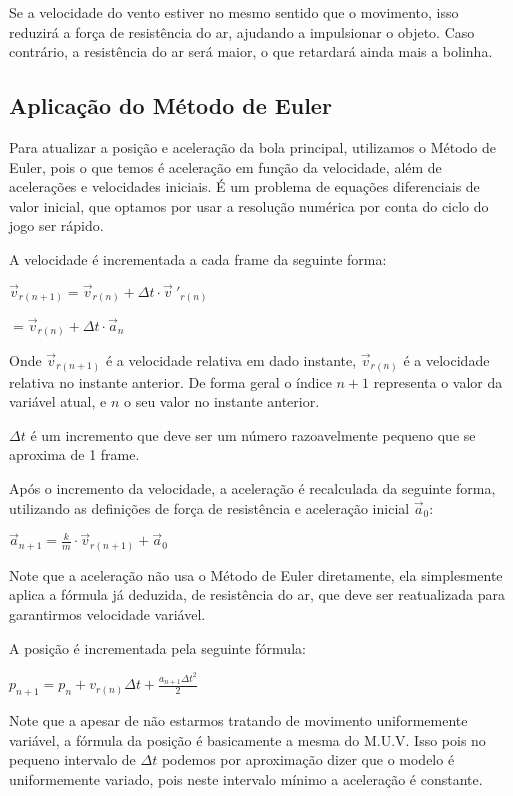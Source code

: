 \documentclass[12pt,letterpaper]{article}
\begin{document}
Se a velocidade do vento estiver no mesmo sentido que o movimento, isso reduzirá a força de resistência do ar, ajudando a impulsionar o objeto.
Caso contrário, a resistência do ar será maior, o que retardará ainda mais a bolinha.

\subsection*{Aplicação do Método de Euler}

Para atualizar a posição e aceleração da bola principal, utilizamos o Método de Euler, pois o que temos é aceleração em função da velocidade, além de acelerações e velocidades iniciais. É um problema de equações diferenciais de valor inicial, que optamos por usar a resolução numérica por conta do ciclo do jogo ser rápido.

A velocidade é incrementada a cada frame da seguinte forma:

$\vec{v}_{r(n+1)}=\vec{v}_{r(n)}+\Delta t\cdot  \vec{v}~'_{r(n)}$

$=\vec{v}_{r(n)}+\Delta t\cdot  \vec{a}_{n}$

Onde $\vec{v}_{r(n+1)}$ é a velocidade relativa em dado instante, $\vec{v}_{r(n)}$ é a velocidade relativa no instante anterior.
De forma geral o índice $n+1$ representa o valor da variável atual, e $n$ o seu valor no instante anterior.

$\Delta t$ é um incremento que deve ser um número razoavelmente pequeno que se aproxima de 1 frame.

Após o incremento da velocidade, a aceleração é recalculada da seguinte forma, utilizando as definições de força de resistência e aceleração inicial $\vec{a}_0$:

$\vec{a}_{n+1}=\displaystyle\frac k m\cdot\vec{v}_{r(n+1)}+\vec{a}_0$

Note que a aceleração não usa o Método de Euler diretamente, ela simplesmente aplica a fórmula já deduzida, de resistência do ar, que deve ser reatualizada para garantirmos velocidade variável.

A posição é incrementada pela seguinte fórmula:

$p_{n+1}=p_n+v_{r(n)}\Delta t+\displaystyle\frac{a_{n+1}\Delta t^2}{2}$

Note que a apesar de não estarmos tratando de movimento uniformemente variável, a fórmula da posição é basicamente a mesma do M.U.V. Isso pois no pequeno intervalo de $\Delta t$ podemos por aproximação dizer que o modelo é uniformemente variado, pois neste intervalo mínimo a aceleração é constante.
\end{document}
